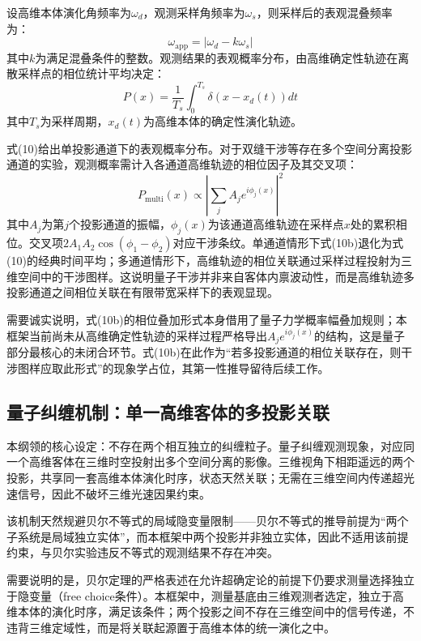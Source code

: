 \documentclass[UTF8]{csoarticle}
\begin{document}
设高维本体演化角频率为$\omega_d$，观测采样角频率为$\omega_s$，则采样后的表观混叠频率为：
\begin{equation}
\omega_{\text{app}} = |\omega_d - k\omega_s|
\end{equation}
其中$k$为满足混叠条件的整数。观测结果的表观概率分布，由高维确定性轨迹在离散采样点的相位统计平均决定：
\begin{equation}
P(x) = \frac{1}{T_s} \int_0^{T_s} \delta(x - x_d(t)) dt
\end{equation}
其中$T_s$为采样周期，$x_d(t)$为高维本体的确定性演化轨迹。

式(10)给出单投影通道下的表观概率分布。对于双缝干涉等存在多个空间分离投影通道的实验，观测概率需计入各通道高维轨迹的相位因子及其交叉项：
\begin{equation*}
P_{\text{multi}}(x) \propto \left| \sum_{j} A_j e^{i \phi_j(x)} \right|^2
\tag{10b}
\end{equation*}
其中$A_j$为第$j$个投影通道的振幅，$\phi_j(x)$为该通道高维轨迹在采样点$x$处的累积相位。交叉项$2A_1 A_2 \cos(\phi_1 - \phi_2)$对应干涉条纹。单通道情形下式(10b)退化为式(10)的经典时间平均；多通道情形下，高维轨迹的相位关联通过采样过程投射为三维空间中的干涉图样。这说明量子干涉并非来自客体内禀波动性，而是高维轨迹多投影通道之间相位关联在有限带宽采样下的表观显现。

需要诚实说明，式(10b)的相位叠加形式本身借用了量子力学概率幅叠加规则；本框架当前尚未从高维确定性轨迹的采样过程严格导出$A_j e^{i\phi_j(x)}$的结构，这是量子部分最核心的未闭合环节。式(10b)在此作为“若多投影通道的相位关联存在，则干涉图样应取此形式”的现象学占位，其第一性推导留待后续工作。

\subsection{量子纠缠机制：单一高维客体的多投影关联}
本纲领的核心设定：不存在两个相互独立的纠缠粒子。量子纠缠观测现象，对应同一个高维客体在三维时空投射出多个空间分离的影像。三维视角下相距遥远的两个投影，共享同一套高维本体演化时序，状态天然关联；无需在三维空间内传递超光速信号，因此不破坏三维光速因果约束。

该机制天然规避贝尔不等式的局域隐变量限制——贝尔不等式的推导前提为“两个子系统是局域独立实体”，而本框架中两个投影并非独立实体，因此不适用该前提约束，与贝尔实验违反不等式的观测结果不存在冲突。

需要说明的是，贝尔定理的严格表述在允许超确定论的前提下仍要求测量选择独立于隐变量（free choice条件）。本框架中，测量基底由三维观测者选定，独立于高维本体的演化时序，满足该条件；两个投影之间不存在三维空间中的信号传递，不违背三维定域性，而是将关联起源置于高维本体的统一演化之中。
\end{document}
